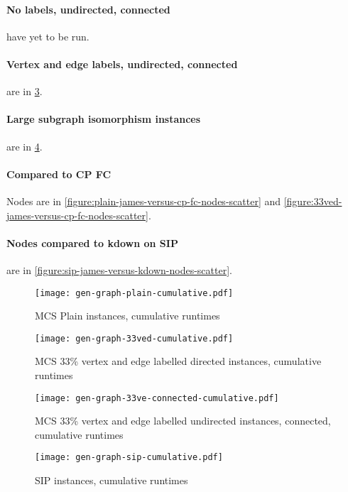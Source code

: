 \documentclass[letterpaper]{article}
\begin{document}
\paragraph{No labels, undirected, connected} have yet to be run.

\paragraph{Vertex and edge labels, undirected, connected} are in \cref{figure:33ve-connected-cumulative}.

\paragraph{Large subgraph isomorphism instances} are in \cref{figure:sip-cumulative}.

\paragraph{Compared to CP FC} Nodes are in \cref{figure:plain-james-versus-cp-fc-nodes-scatter} and \cref{figure:33ved-james-versus-cp-fc-nodes-scatter}.

\paragraph{Nodes compared to kdown on SIP} are in \cref{figure:sip-james-versus-kdown-nodes-scatter}.

\begin{figure}
    \centering
    \texttt{[image: gen-graph-plain-cumulative.pdf]}
    \caption{MCS Plain instances, cumulative runtimes}\label{figure:plain-cumulative}
\end{figure}

\begin{figure}
    \centering
    \texttt{[image: gen-graph-33ved-cumulative.pdf]}
    \caption{MCS 33\% vertex and edge labelled directed instances, cumulative runtimes}\label{figure:33ved-cumulative}
\end{figure}

\begin{figure}
    \centering
    \texttt{[image: gen-graph-33ve-connected-cumulative.pdf]}
    \caption{MCS 33\% vertex and edge labelled undirected instances, connected, cumulative runtimes}\label{figure:33ve-connected-cumulative}
\end{figure}

\begin{figure}
    \centering
    \texttt{[image: gen-graph-sip-cumulative.pdf]}
    \caption{SIP instances, cumulative runtimes}\label{figure:sip-cumulative}
\end{figure}
\end{document}
